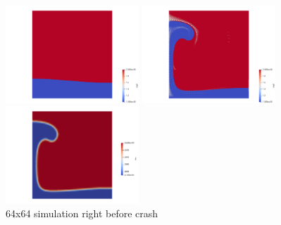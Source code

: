 \begin{center}
\includegraphics[width=5cm]{python_codes/fieldstone_41/results/64x64_10_RK3/markers0000}
\includegraphics[width=5cm]{python_codes/fieldstone_41/results/64x64_10_RK3/markers0143}
\includegraphics[width=5cm]{python_codes/fieldstone_41/results/64x64_10_RK3/rho_nodal_0143}\\
{\captionfont 64x64 simulation right before crash}
\end{center}




